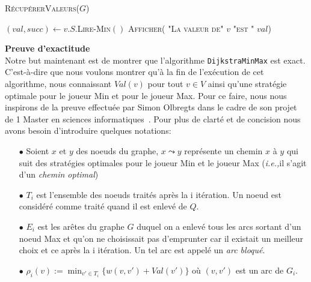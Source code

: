 \begin{algorithm}
	\caption{\textsc{RécupérerValeurs}($G$)}
	\label{algo:recupVal}
	\begin{algorithmic}[1]
	
		\STATE $(val,succ) \leftarrow v.S.$\textsc{Lire-Min}$()$
		\STATE \textsc{Afficher( "La valeur de" $v$ "est " $val$)}
	\ENDFOR
	
	
	\end{algorithmic}
\end{algorithm}


\FloatBarrier
	



\noindent\textbf{Preuve d'exactitude}\\

Notre but maintenant est de montrer que l'algorithme \verb|DijkstraMinMax| est exact. C'est-à-dire que nous voulons montrer qu'à la fin de l'exécution de cet algorithme, nous connaissant $Val(v)$ pour tout $v\in V$ ainsi qu'une stratégie optimale pour le joueur Min et pour le joueur Max.
Pour ce faire, nous nous inspirons de la preuve effectuée par Simon Olbregts dans le cadre de son projet de 1 Master en sciences informatiques~\cite{simon}. 
Pour plus de clarté et de concision nous avons besoin d'introduire quelques notations:\\

\begin{itemize}
	\item[$\bullet$] Soient $x$ et $y$ des noeuds du graphe, $x \leadsto y$ représente un chemin $x$ à $y$ qui suit des stratégies optimales pour le joueur Min et le joueur Max (\emph{i.e.,}il s'agit d'un \emph{chemin optimal})
	\item[$\bullet$] $T_{i}$ est l'ensemble des noeuds traités après la i itération. Un noeud est considéré comme traité quand il est enlevé de $Q$.
	\item[$\bullet$] $E_i$ est les arêtes du graphe $G$ duquel on a enlevé tous les arcs sortant d'un noeud Max et qu'on ne choisissait pas d'emprunter car il existait un meilleur choix et ce après la i itération. Un tel arc est appelé un \emph{arc bloqué}.
	\item[$\bullet$] $\rho_i(v) := \min _{v' \in T_i}\{ w(v,v') + Val(v') \} $ où $(v,v')$ est un arc de $G_i$.
\end{itemize}

